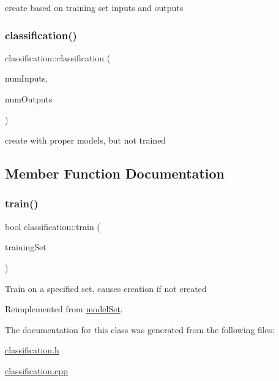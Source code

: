 create based on training set inputs and outputs \mbox{\label{classclassification_ab76d1e8c617be54ede9ea47dd3c128bf}} 
\subsubsection{\texorpdfstring{classification()}{classification()}\hspace{0.1cm}{\footnotesize\ttfamily [3/3]}}
{\footnotesize\ttfamily classification\+::classification (\begin{DoxyParamCaption}\item[{int}]{num\+Inputs,  }\item[{int}]{num\+Outputs }\end{DoxyParamCaption})}

create with proper models, but not trained 

\subsection{Member Function Documentation}
\mbox{\label{classclassification_a8e834c25309bc471c5bb8e8730874c82}} 
\subsubsection{\texorpdfstring{train()}{train()}}
{\footnotesize\ttfamily bool classification\+::train (\begin{DoxyParamCaption}\item[{std\+::vector$<$ \hyperlink{structtraining_example}{training\+Example} $>$}]{training\+Set }\end{DoxyParamCaption})\hspace{0.3cm}{\ttfamily [virtual]}}

Train on a specified set, causes creation if not created 

Reimplemented from \hyperlink{classmodel_set_ab0b16ec988c8077158de1c3d8986df03}{model\+Set}.



The documentation for this class was generated from the following files\+:\begin{DoxyCompactItemize}
\item 
\hyperlink{classification_8h}{classification.\+h}\item 
\hyperlink{classification_8cpp}{classification.\+cpp}\end{DoxyCompactItemize}
